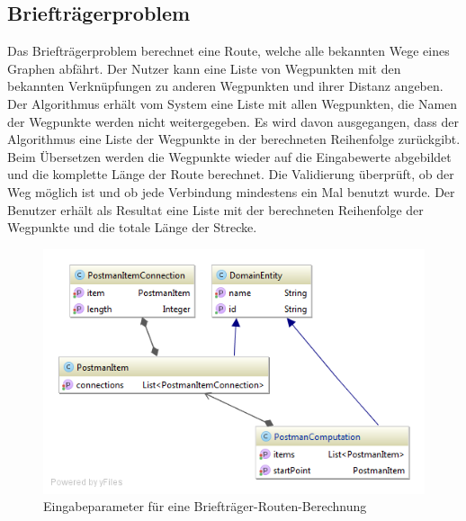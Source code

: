 %
%
%
%

\subsection{Briefträgerproblem}
Das Briefträgerproblem berechnet eine Route, welche alle bekannten Wege eines Graphen abfährt. Der Nutzer kann eine Liste von Wegpunkten mit den bekannten Verknüpfungen zu anderen 
Wegpunkten und ihrer Distanz angeben. Der Algorithmus erhält vom System eine Liste mit allen Wegpunkten, die Namen der Wegpunkte werden nicht weitergegeben. Es wird davon ausgegangen, 
dass der Algorithmus eine Liste der Wegpunkte in der berechneten Reihenfolge zurückgibt. Beim Übersetzen werden die Wegpunkte wieder auf die Eingabewerte abgebildet und die komplette 
Länge der Route berechnet. Die Validierung überprüft, ob der Weg möglich ist und ob jede Verbindung mindestens ein Mal benutzt wurde. Der Benutzer erhält als Resultat eine Liste mit der berechneten 
Reihenfolge der Wegpunkte und die totale Länge der Strecke.

\begin{figure}[h]
\centering
\includegraphics[scale=0.5]{images/probleme/postman.png}
\caption[Eingabeparameter für eine Briefträger-Routen-Berechnung]{Eingabeparameter für eine Briefträger-Routen-Berechnung \selfmade{}}
\label{fig:postman_input}
\end{figure}

\FloatBarrier
%
%
%
%

